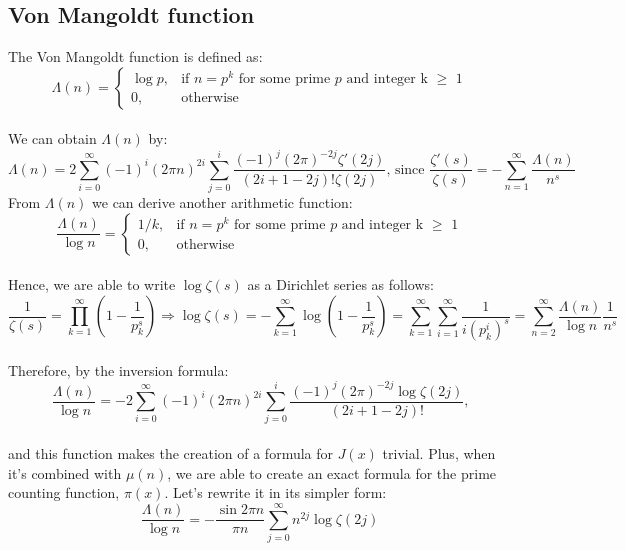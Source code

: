 \documentclass[12pt]{article}
\begin{document}
\subsection{Von Mangoldt function}
The Von Mangoldt function is defined as:
\begin{equation}
\Lambda(n)=\begin{cases} \nonumber 
\log{p}, & \text{if $n=p^k$ for some prime $p$ and integer k $\geq$ 1}\\
0, & \text{otherwise} 
\end{cases}
\end{equation}\\
\indent We can obtain $\Lambda(n)$ by:
\begin{equation} \nonumber
\Lambda(n)=2\sum_{i=0}^{\infty} (-1)^i (2\pi n)^{2i}\sum_{j=0}^{i} \frac{(-1)^j (2\pi)^{-2j}\zeta'(2j)}{(2i+1-2j)!\zeta(2j)} \text{, since }\frac{\zeta'(s)}{\zeta(s)}=-\sum_{n=1}^{\infty}\frac{\Lambda(n)}{n^{s}}
\end{equation}
\indent From $\Lambda(n)$ we can derive another arithmetic function:
\begin{equation}
\frac{\Lambda(n)}{\log{n}}=\begin{cases} \nonumber 
1/k, & \text{if $n=p^k$ for some prime $p$ and integer k $\geq$ 1}\\
0, & \text{otherwise} 
\end{cases}
\end{equation}\\
\indent Hence, we are able to write $\log{\zeta(s)}$ as a Dirichlet series as follows:
\begin{equation} \nonumber
\frac{1}{\zeta(s)}=\prod_{k=1}^{\infty} \left(1-\frac{1}{p_{k}^{s}}\right) \Rightarrow \log{\zeta(s)}=-\sum_{k=1}^{\infty}\log\left(1-\frac{1}{p_{k}^{s}}\right)=\sum_{k=1}^{\infty}\sum_{i=1}^{\infty}\frac{1}{i \left(p_{k}^i\right)^{s}}=\sum_{n=2}^{\infty}\frac{\Lambda(n)}{\log{n}}\frac{1}{n^{s}}
\end{equation}\\
\indent Therefore, by the inversion formula: 
\begin{equation} \label{eq:van} \nonumber
\frac{\Lambda(n)}{\log{n}}=-2\sum_{i=0}^{\infty} (-1)^i (2\pi n)^{2i}\sum_{j=0}^{i} \frac{(-1)^j (2\pi)^{-2j}\log{\zeta(2j)}}{(2i+1-2j)!} \text{,}
\end{equation}\\
\noindent and this function makes the creation of a formula for $J(x)$ trivial. Plus, when it's combined with $\mu(n)$, we are able to create an exact formula for the prime counting function, $\pi(x)$. Let's rewrite it in its simpler form:
\begin{equation} \label{eq:van2} \nonumber
\frac{\Lambda(n)}{\log{n}}=-\frac{\sin{2\pi n}}{\pi n}\sum_{j=0}^{\infty} n^{2j}\log{\zeta{(2j)}}
\end{equation}
\end{document}
